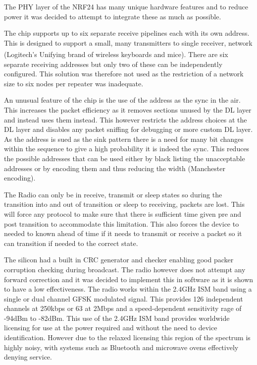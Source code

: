 The \ac{PHY} layer of the \ac{NRF24} has many unique hardware features and to reduce power
it was decided to attempt to integrate these as much as possible.


The chip supports up to six separate receive pipelines each with its own address. This is designed to
support a small, many transmitters to single receiver, network (\eg Logitech's Unifying\textsuperscript{\textregistered} brand of
wireless keyboards and mice). There are six separate receiving addresses but only two of these can 
be independently configured. This solution was therefore not used as the restriction of a network
size to six nodes per repeater was inadequate.

An unusual feature of the chip is the use of the address as the sync in the air. This increases the
packet efficiency as it removes sections unused by the \ac{DL} layer and instead uses them instead. This
however restricts the address choices at the DL layer and disables any packet sniffing for debugging
or more custom \ac{DL} layer. As the address is sued as the sink pattern there is a need for many bit
changes within the sequence to give a high probability it is indeed the sync. This reduces the possible
addresses that can be used either by black listing the unacceptable addresses or by encoding them
and thus reducing the width (\eg Manchester encoding).


The Radio can only be in receive, transmit or sleep states so during the transition into and out of
transition or sleep to receiving, packets are lost. This will force any protocol to make sure that there
is sufficient time given pre and post transition to accommodate this limitation. This also forces the
device to needed to known ahead of time if it needs to transmit or receive a packet so it can
transition if needed to the correct state.


The silicon had a built in \ac{CRC} generator and checker enabling good packer corruption checking
during broadcast. The radio however does not attempt any forward correction and it was decided to
implement this in software as it is shown to have a low effectiveness\cite{NetworkDesign1998}.
The radio works within the 2.4GHz \ac{ISM} band using a single or dual channel \ac{GFSK} modulated signal.
This provides 126 independent channels at 250kbps or 63 at 2Mbps and a speed-dependent
sensitivity rage of -94dBm to -82dBm. This use of the 2.4GHz \ac{ISM} band provides worldwide licensing
for use at the power required and without the need to device identification. However due to the
relaxed licensing this region of the spectrum is highly noisy, with systems such as Bluetooth and
microwave ovens effectively denying service.

